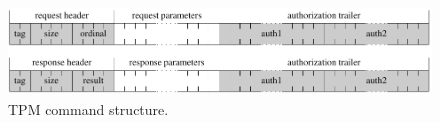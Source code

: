 \documentclass[runningheads]{llncs}
\begin{document}
\begin{figure}[!h]
	\centering
	\includegraphics[height=24mm]{figures/tpm_command_structure}
	\caption{TPM command structure.}
	\label{fig:tpm_command}\vspace*{-2mm}
\end{figure}


%
\end{document}
